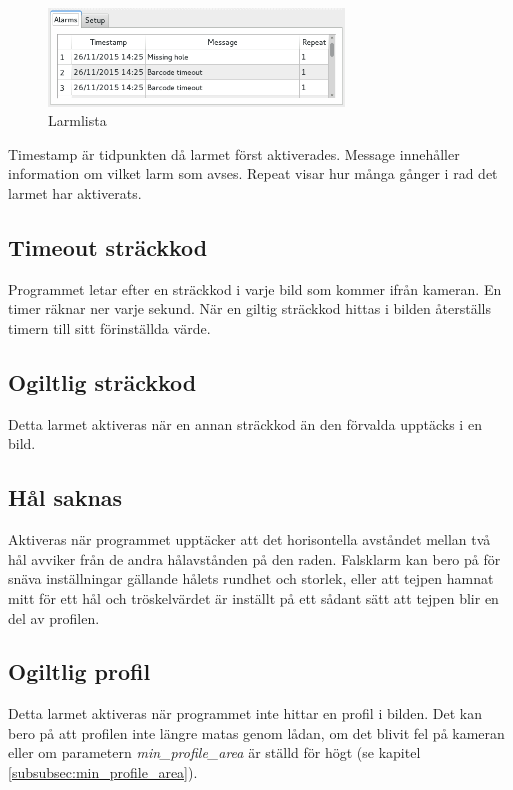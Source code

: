 \documentclass[a4paper]{article}
\begin{document}
	\begin{figure}[H]
	  	\centering
		\includegraphics[width=0.7\textwidth]{alarm_list}
		\caption{Larmlista}\label{fig:alarm_list}
	\end{figure}
	Timestamp är tidpunkten då larmet först aktiverades. Message innehåller information om vilket larm som avses. Repeat visar hur många gånger i rad det larmet har aktiverats.

	\subsection{Timeout sträckkod}\label{subsec:barcode_timeout}
		Programmet letar efter en sträckkod i varje bild som kommer ifrån kameran. En timer räknar ner varje sekund.
		När en giltig sträckkod hittas i bilden återställs timern till sitt förinställda värde.

	\subsection{Ogiltlig sträckkod}\label{subsec:invalid_barcode}
		Detta larmet aktiveras när en annan sträckkod än den förvalda upptäcks i en bild.

	\subsection{Hål saknas}\label{subsec:missing_hole}
		Aktiveras när programmet upptäcker att det horisontella avståndet mellan två hål avviker från de andra hålavstånden på den raden.
		Falsklarm kan bero på för snäva inställningar gällande hålets rundhet och storlek, eller att tejpen hamnat mitt för ett hål och tröskelvärdet är inställt
		på ett sådant sätt att tejpen blir en del av profilen.

	\subsection{Ogiltlig profil}\label{subsec:invalid_profile}
	Detta larmet aktiveras när programmet inte hittar en profil i bilden. Det kan bero på att profilen inte längre matas genom lådan, om det blivit fel på kameran eller om parametern \textit{min\_profile\_area}
	är ställd för högt (se kapitel \ref{subsubsec:min_profile_area}).
\end{document}
